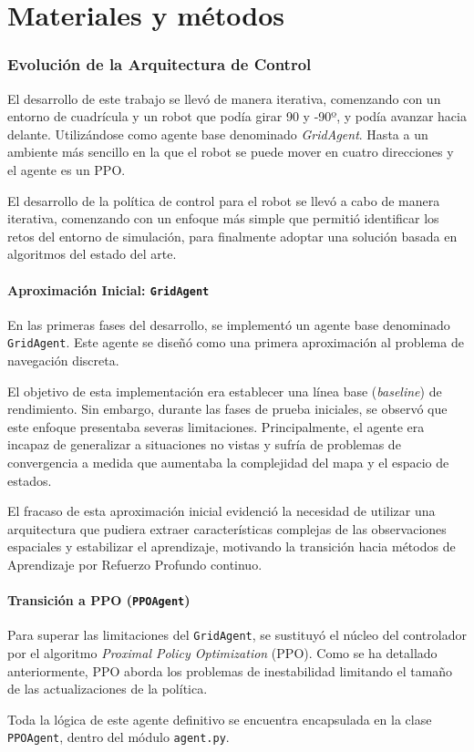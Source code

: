 \chapter{Materiales y métodos}

\subsection{Evolución de la Arquitectura de Control}
El desarrollo de este trabajo se llevó de manera iterativa, comenzando con un entorno de cuadrícula y un robot que podía girar 90 y -90º, y podía avanzar hacia delante. Utilizándose como agente base denominado \textit{GridAgent}. Hasta a un ambiente más sencillo en la que el robot se puede mover en cuatro direcciones y el agente es un PPO.

El desarrollo de la política de control para el robot se llevó a cabo de manera iterativa, comenzando con un enfoque más simple que permitió identificar los retos del entorno de simulación, para finalmente adoptar una solución basada en algoritmos del estado del arte.

\subsubsection{Aproximación Inicial: \texttt{GridAgent}}
En las primeras fases del desarrollo, se implementó un agente base denominado \texttt{GridAgent}. Este agente se diseñó como una primera aproximación al problema de navegación discreta.

El objetivo de esta implementación era establecer una línea base (\textit{baseline}) de rendimiento. Sin embargo, durante las fases de prueba iniciales, se observó que este enfoque presentaba severas limitaciones. Principalmente, el agente era incapaz de generalizar a situaciones no vistas y sufría de problemas de convergencia a medida que aumentaba la complejidad del mapa y el espacio de estados.

El fracaso de esta aproximación inicial evidenció la necesidad de utilizar una arquitectura que pudiera extraer características complejas de las observaciones espaciales y estabilizar el aprendizaje, motivando la transición hacia métodos de Aprendizaje por Refuerzo Profundo continuo.

\subsubsection{Transición a PPO (\texttt{PPOAgent})}
Para superar las limitaciones del \texttt{GridAgent}, se sustituyó el núcleo del controlador por el algoritmo \textit{Proximal Policy Optimization} (PPO). Como se ha detallado anteriormente, PPO aborda los problemas de inestabilidad limitando el tamaño de las actualizaciones de la política.

Toda la lógica de este agente definitivo se encuentra encapsulada en la clase \texttt{PPOAgent}, dentro del módulo \texttt{agent.py}. %

